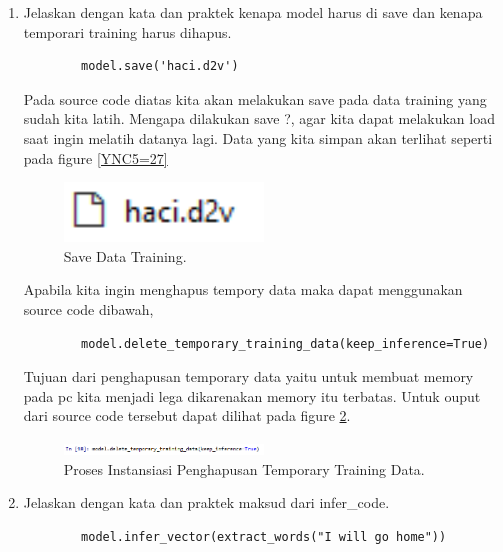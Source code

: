 \begin{enumerate}
\item Jelaskan dengan kata dan praktek kenapa model harus di save dan kenapa temporari training harus dihapus.

	\begin{verbatim}
		model.save('haci.d2v')
	\end{verbatim}
	
	\subitem Pada source code diatas kita akan melakukan save pada data training yang sudah kita latih. Mengapa dilakukan save ?, agar kita dapat melakukan load saat ingin melatih datanya lagi. Data yang kita simpan akan terlihat seperti pada figure \ref{YNC5=27}

	\begin{figure}[!htbp]
		\centerline{\includegraphics[width=0.5\textwidth]{figures/YN/Chapter5/Praktek/YNC5-27.PNG}}
		\caption{Save Data Training.}
		\label{YNC5-27}
	\end{figure}

	\subitem Apabila kita ingin menghapus tempory data maka dapat menggunakan source code dibawah,

	\begin{verbatim}
		model.delete_temporary_training_data(keep_inference=True)
	\end{verbatim}		

		 Tujuan dari penghapusan temporary data yaitu untuk membuat memory pada pc kita menjadi lega dikarenakan memory itu terbatas. Untuk ouput dari source code tersebut dapat dilihat pada figure \ref{YNC5-26}.

	\begin{figure}[!htbp]
		\centerline{\includegraphics[width=0.5\textwidth]{figures/YN/Chapter5/Praktek/YNC5-26.PNG}}
		\caption{Proses Instansiasi Penghapusan Temporary Training Data.}
		\label{YNC5-26}
	\end{figure}

\item Jelaskan dengan kata dan praktek maksud dari infer\_code.

	\begin{verbatim}
		model.infer_vector(extract_words("I will go home"))
	\end{verbatim}


\end{enumerate}

